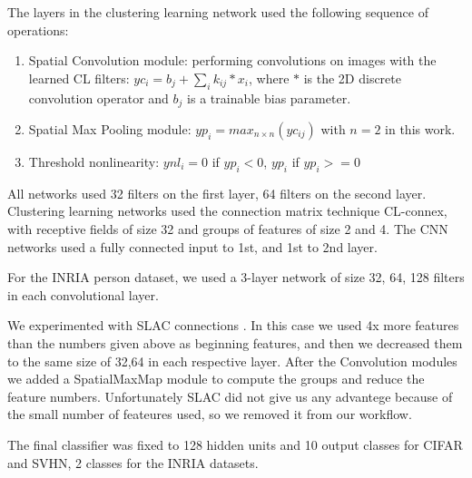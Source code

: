 \documentclass{article} %
\begin{document}
The layers in the clustering learning network used the following sequence of operations:
\begin{enumerate}
\item Spatial Convolution module: performing convolutions on images with the learned CL filters: $yc_i=b_j+\sum_i{k_{ij}\ast x_i}$, where $\ast$ is the 2D discrete convolution operator and $b_j$ is a trainable bias parameter.
\item Spatial Max Pooling module: $yp_i = max_{n \times n}(yc_{ij})$ with $n =  2$ in this work.
\item Threshold nonlinearity: $ynl_i = 0$ if $yp_i < 0$, $yp_i$ if $yp_i >= 0$
\end{enumerate}


All networks used 32 filters on the first layer, 64 filters on the second layer. Clustering learning networks used the connection matrix technique CL-connex, with receptive fields of size 32 and groups of features of size 2 and 4. The CNN networks used a fully connected input to 1st, and 1st to 2nd layer. 

For the INRIA person dataset, we used a 3-layer network of size 32, 64, 128 filters in each convolutional layer.

We experimented with SLAC connections \cite{coates2012emergence}. In this case we used 4x more features than the numbers given above as beginning features, and then we decreased them to the same size of 32,64 in each respective layer. After the Convolution modules we added a SpatialMaxMap module to compute the groups and reduce the feature numbers. Unfortunately SLAC did not give us any advantege because of the small number of feateures used, so we removed it from our workflow.

The final classifier was fixed to 128 hidden units and 10 output classes for CIFAR and SVHN, 2 classes for the INRIA datasets.
\end{document}
